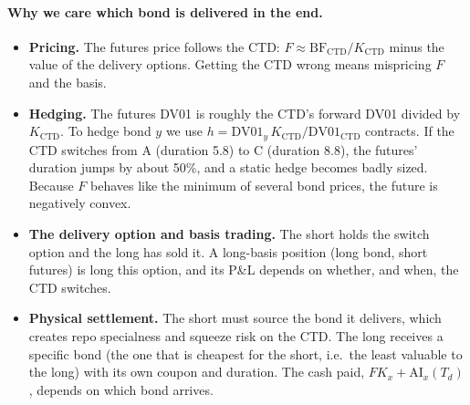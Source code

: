 \documentclass[11pt]{article}
\newcommand{\AI}{\mathrm{AI}}
\newcommand{\BF}{\mathrm{BF}}
\begin{document}
\paragraph{Why we care which bond is delivered in the end.}
\begin{itemize}[leftmargin=*]
\item \textbf{Pricing.} The futures price follows the CTD: $F\approx \BF_{\text{CTD}}/K_{\text{CTD}}$ minus the value of the delivery options. Getting the CTD wrong means mispricing $F$ and the basis.
\item \textbf{Hedging.} The futures DV01 is roughly the CTD's forward DV01 divided by $K_{\text{CTD}}$. To hedge bond $y$ we use $h=\mathrm{DV01}_y\,K_{\text{CTD}}/\mathrm{DV01}_{\text{CTD}}$ contracts. If the CTD switches from A (duration 5.8) to C (duration 8.8), the futures' duration jumps by about 50\%, and a static hedge becomes badly sized. Because $F$ behaves like the minimum of several bond prices, the future is negatively convex.
\item \textbf{The delivery option and basis trading.} The short holds the switch option and the long has sold it. A long-basis position (long bond, short futures) is long this option, and its P\&L depends on whether, and when, the CTD switches.
\item \textbf{Physical settlement.} The short must source the bond it delivers, which creates repo specialness and squeeze risk on the CTD. The long receives a specific bond (the one that is cheapest for the short, i.e.\ the least valuable to the long) with its own coupon and duration. The cash paid, $F K_x+\AI_x(T_d)$, depends on which bond arrives.
\end{itemize}
\end{document}
